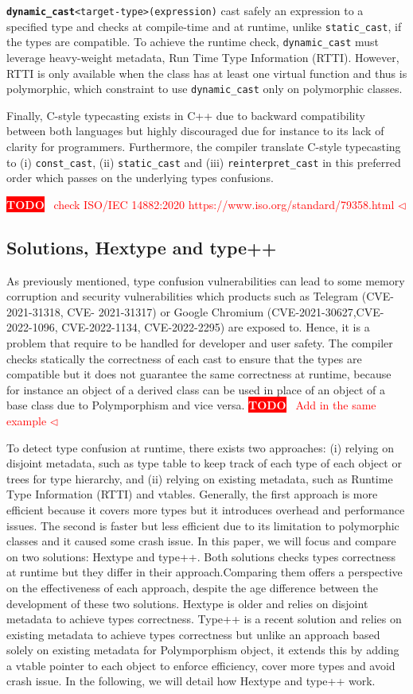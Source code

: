 \documentclass[a4paper,11pt,oneside]{report}
\newcommand{\todobox}[3]{%
       \colorbox{#1}{\textcolor{white}{\sffamily\bfseries\scriptsize #2}}%
       ~\textcolor{#1}{#3} %
       \textcolor{#1}{$\triangleleft$}%
}
\newcommand{\adrbqt}[1]{\todobox{red}{TODO}{#1}}
\begin{document}
\texttt{\textbf{dynamic\_cast}<target-type>(expression)} cast safely an expression to a specified type and checks at compile-time and at runtime, unlike \texttt{static\_cast}, if the types are compatible. 
To achieve the runtime check, \texttt{dynamic\_cast} must leverage heavy-weight metadata, Run Time Type Information (RTTI). However, RTTI is only available when the class has at least one virtual function 
and thus is polymorphic, which constraint to use \texttt{dynamic\_cast} only on polymorphic classes.

Finally, C-style typecasting exists in C++ due to backward compatibility between both languages but highly discouraged due for instance to its lack of clarity for programmers. 
Furthermore, the compiler translate C-style typecasting to (i) \texttt{const\_cast}, (ii) \texttt{static\_cast} and (iii) \texttt{reinterpret\_cast} in this preferred order which passes on the underlying types confusions.

\adrbqt{check ISO/IEC 14882:2020 https://www.iso.org/standard/79358.html}

\subsection{Solutions, Hextype and type++}

As previously mentioned, type confusion vulnerabilities can lead to some memory corruption and security vulnerabilities which products such as Telegram (CVE-2021-31318, CVE-
2021-31317) or Google Chromium (CVE-2021-30627,CVE-2022-1096, CVE-2022-1134, CVE-2022-2295) are exposed to. Hence, it is a problem that require to be handled for developer and user safety. 
The compiler checks statically the correctness of each cast to ensure that the types are compatible but it does not guarantee the same correctness at runtime, 
because for instance an object of a derived class can be used in place of an object of a base class due to Polymporphism and vice versa. \adrbqt{Add in the same example} 
To detect type confusion at runtime, there exists two approaches: (i) relying on disjoint metadata, such as type table to keep track of each type of each object or trees for type hierarchy, and 
(ii) relying on existing metadata, such as Runtime Type Information (RTTI) and vtables. 
Generally, the first approach is more efficient because it covers more types but it introduces overhead and performance issues. The second is faster but less efficient due to its limitation to polymorphic classes and it caused some crash issue. 
In this paper, we will focus and compare on two solutions: Hextype and type++. 
Both solutions checks types correctness at runtime but they differ in their approach.Comparing them offers a perspective on the effectiveness of each approach, despite the age difference between the development of these two solutions.
Hextype is older and relies on disjoint metadata to achieve types correctness. 
Type++ is a recent solution and relies on existing metadata to achieve types correctness but unlike an approach based solely on existing metadata for Polymporphism object,
it extends this by adding a vtable pointer to each object to enforce efficiency, cover more types and avoid crash issue. In the following, we will detail how Hextype and type++ work.
\end{document}
